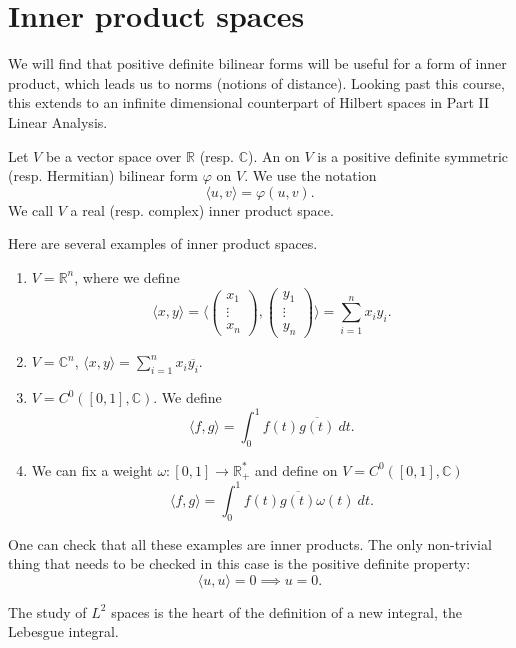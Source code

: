 \documentclass[a4paper]{scrartcl}
\begin{document}
\section{Inner product spaces}
We will find that positive definite bilinear forms will be useful for a form of inner product, which leads us to norms (notions of distance). Looking past this course, this extends to an infinite dimensional counterpart of Hilbert spaces in Part II Linear Analysis.
\begin{definition}
      Let $V$ be a vector space over $\mathbb{R}$ (resp. $\mathbb{C}$). An  on $V$ is a positive definite symmetric (resp. Hermitian) bilinear form $\varphi$ on $V$. We use the notation 
      \[\langle u ,v \rangle =\varphi \left(u,v\right).\]
      We call $V$ a real (resp. complex) inner product space.
\end{definition}
\begin{example}
     Here are several examples of inner product spaces.
      \begin{enumerate}
           \item $V=\mathbb{R}^{n} $, where we define 
           \[\langle x ,y \rangle =\langle \begin{pmatrix}
           x_1\\\vdots\\x_n
           \end{pmatrix}, \begin{pmatrix}
           y_1\\\vdots\\y_n
           \end{pmatrix}\rangle
           =\sum_{i=1}^{n}x_i y_i
           .\]
           \item $V=\mathbb{C}^n$, $\langle x ,y \rangle =\sum_{i=1}^{n}x_i \overline{y_i} $.
           \item $V=C^{0} \left([0,1],\mathbb{C}\right)$. We define 
           \[\langle f,g \rangle =\int_{0}^{1}f \left(t\right)\overline{g \left(t\right)} \ dt.\]
           \item We can fix a weight $\omega: [0,1] \rightarrow \mathbb{R}^*_+$ and define on $V=C^{0} \left([0,1],\mathbb{C}\right)$ 
           \[\langle f,g \rangle =\int_{0}^{1}f \left(t\right)\overline{g \left(t\right)} \omega \left(t\right) \ dt.\]
      \end{enumerate}
      One can check that all these examples are inner products. The only non-trivial thing that needs to be checked in this case is the positive definite property: 
      \[\langle u,u \rangle =0 \implies u=0.\]
\end{example}
\begin{remark}
      The study of $L^2$ spaces is the heart of the definition of a new integral, the Lebesgue integral.
\end{remark}
\end{document}
